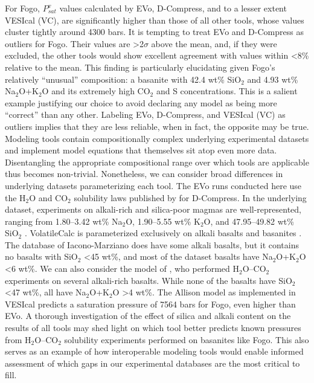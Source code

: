 \documentclass[draft, english]{volcanica-template}
\begin{document}
For Fogo, $P^v_{sat}$ values calculated by EVo, D-Compress, and to a lesser extent VESIcal (VC), are significantly higher than those of all other tools, whose values cluster tightly around 4300 bars. It is tempting to treat EVo and D-Compress as outliers for Fogo. Their values are >2$\sigma$ above the mean, and, if they were excluded, the other tools would show excellent agreement with values within <8\% relative to the mean. This finding is particularly elucidating given Fogo's relatively ``unusual'' composition: a basanite with 42.4 wt\% SiO$_2$ and 4.93 wt\% Na$_2$O+K$_2$O \parencite{lemaitre2005} and its extremely high CO$_2$ and S concentrations. This is a salient example justifying our choice to avoid declaring any model as being more ``correct'' than any other. Labeling EVo, D-Compress, and VESIcal (VC) as outliers implies that they are less reliable, when in fact, the opposite may be true. Modeling tools contain compositionally complex underlying experimental datasets and implement model equations that themselves sit atop even more data. Disentangling the appropriate compositional range over which tools are applicable thus becomes non-trivial. Nonetheless, we can consider broad differences in underlying datasets parameterizing each tool. The EVo runs conducted here use the H$_2$O and CO$_2$ solubility laws published by \textcite{Burgisser2015} for D-Compress. In the underlying dataset, experiments on alkali-rich and silica-poor magmas are well-represented, ranging from 1.80–3.42 wt\% Na$_2$O, 1.90–5.55 wt\% K$_2$O, and 47.95–49.82 wt\% SiO$_2$ \parencite{beermann2011,botcharnikov2011-gold,lesne2011HCSCl,lesne2011carbon}. VolatileCalc is parameterized exclusively on alkali basalts and basanites \parencite{dixon1997, Newman2002}. The database of Iacono-Marziano \parencite{IaconoMarziano2012} does have some alkali basalts, but it contains no basalts with SiO$_2$ <45 wt\%, and most of the dataset basalts have Na$_2$O+K$_2$O <6 wt\%. We can also consider the model of \textcite{allison2019}, who performed H$_2$O–CO$_2$ experiments on several alkali-rich basalts. While none of the basalts have SiO$_2$ <47 wt\%, all have Na$_2$O+K$_2$O >4 wt\%. The Allison model as implemented in VESIcal \parencite[``AllisonCarbon'';][]{allison2019} predicts a saturation pressure of 7564 bars for Fogo, even higher than EVo. A thorough investigation of the effect of silica and alkali content on the results of all tools may shed light on which tool better predicts known pressures from H$_2$O–CO$_2$ solubility experiments performed on basanites like Fogo. This also serves as an example of how interoperable modeling tools would enable informed assessment of which gaps in our experimental databases are the most critical to fill.
\end{document}
